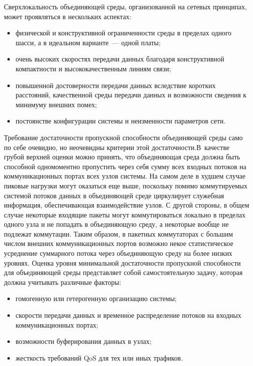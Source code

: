 \begin{multicols}{2}
     Сверхлокальность объединяющей среды, организованной на сетевых принципах, 
может проявляться в нескольких аспектах:
     \begin{itemize}
\item физической и конструктивной ограниченности среды в пределах одного шасси, а в 
идеальном варианте~--- одной платы;
\item очень высоких скоростях передачи данных благодаря конструктивной компактности и 
высококачественным линиям связи;
\item повышенной достоверности передачи данных вследствие коротких расстояний, 
качественной среды передачи данных и возможности сведения к минимуму внешних помех;
\item постоянстве конфигурации системы и неизменности параметров сети.
\end{itemize}

     Требование достаточности пропускной способности объединяющей среды само по себе 
очевид\-но, но неочевидны критерии этой достаточности.\linebreak В~качестве грубой верхней оценки 
можно принять, что объединяющая среда должна быть способной одномоментно пропустить 
через себя сумму всех входных потоков на коммуникационных портах всех %
 узлов системы. 
На самом деле в худшем случае пиковые нагрузки могут оказаться еще выше, поскольку 
помимо коммутируемых системой потоков данных в объединяющей среде циркулирует 
служебная информация, обеспечивающая взаимодействие узлов. С другой стороны, в общем 
случае некоторые входящие пакеты могут коммутироваться локально в пределах одного узла 
и не попадать в объединяющую среду, а некоторые вообще не подлежат коммутации. 
Таким образом, в пакетных коммутаторах с большим числом внешних коммуникационных 
портов возможно некое статистическое усреднение суммарного потока через объеди\-ня\-ющую 
среду на более низких уровнях. Оценка уровня минимальной достаточности пропускной 
способности для объединяющей среды представляет собой самостоятельную задачу, которая 
должна учитывать различные факторы:
     \begin{itemize}
\item гомогенную или гетерогенную организацию сис\-те\-мы;
\item скорости передачи данных и временн$\acute{\mbox{о}}$е распределение потоков на 
входных коммуникационных портах;
\item возможности буферирования данных в узлах;
\item жесткость требований QoS для тех или иных трафиков.
\end{itemize}


\end{multicols}
